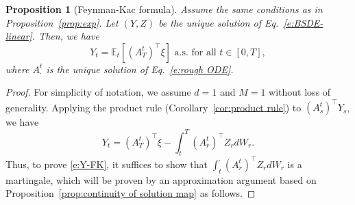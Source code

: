 \documentclass[11pt,reqno]{amsart}
\newtheorem{proposition}{Proposition}[section]
\numberwithin{equation}{section}
\begin{document}
\begin{proposition}[Feynman-Kac formula]\label{prop:exp'}
Assume the same conditions as in Proposition~\ref{prop:exp}. Let $(Y,Z)$ be the unique solution of Eq.~\eqref{e:BSDE-linear}. Then, we have 
\begin{equation}\label{e:Y-FK}
Y_{t} = \mathbb{E}_{t}\left[(A^{t}_{T})^{\top}\xi\right] \text{  a.s. for all }  t\in[0,T],
\end{equation} 
where $  A^{t}_{\cdot}$ is the unique solution of Eq.~\eqref{e:rough ODE}.

 

\end{proposition}
\begin{proof}
For simplicity of notation, we assume $d=1$ and $M=1$ without loss of generality.
Applying the product rule (Corollary~\ref{cor:product rule}) to $(A^{t}_s)^{\top}Y_{s}$, we have
\[Y_t =(A_T^t)^\top \xi -\int_t^T (A_r^t)^\top Z_r dW_r.\]
Thus, to prove \eqref{e:Y-FK}, it suffices to show that $\int_t^\cdot (A_r^t)^\top Z_r dW_r$ is a martingale, which will be proven by an approximation argument based on Proposition~\ref{prop:continuity of solution map} as follows. 



\end{proof}
\end{document}
